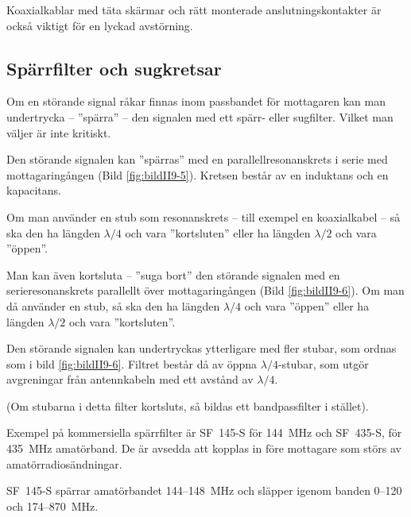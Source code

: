 Koaxialkablar med täta skärmar och rätt monterade anslutningskontakter är också
viktigt för en lyckad avstörning.

\subsection{Spärrfilter och sugkretsar}
\label{spärrfilter}
\label{Sugkretsar}




Om en störande signal råkar finnas inom passbandet för mottagaren kan
man undertrycka -- ''spärra'' -- den signalen med ett spärr- eller sugfilter.
Vilket man väljer är inte kritiskt.

Den störande signalen kan ''spärras'' med en parallellresonanskrets i
serie med mottagaringången (Bild \ref{fig:bildII9-5}).
Kretsen består av en induktans och en kapacitans.

Om man använder en stub som resonanskrets -- till exempel en koaxialkabel -- så
ska den ha längden \(\lambda/4\) och vara ''kortsluten'' eller ha
längden \(\lambda/2\) och vara ''öppen''.

Man kan även kortsluta -- ''suga bort'' den störande signalen med en
serieresonanskrets parallellt över mottagaringången (Bild \ref{fig:bildII9-6}).
Om man då använder en stub, så ska den ha längden \(\lambda/4\) och
vara ''öppen'' eller ha längden \(\lambda/2\) och vara ''kortsluten''.

Den störande signalen kan undertryckas ytterligare med fler stubar,
som ordnas som i bild \ref{fig:bildII9-6}.
Filtret består då av öppna \(\lambda/4\)-stubar, som utgör avgreningar från
antennkabeln med ett avstånd av \(\lambda/4\).

(Om stubarna i detta filter kortsluts, så bildas ett bandpassfilter i stället).

Exempel på kommersiella spärrfilter är SF~145-S för 144~MHz och
SF~435-S, för 435~MHz amatörband.
De är avsedda att kopplas in före mottagare som störs av amatörradiosändningar.

SF~145-S spärrar amatörbandet 144--148~MHz och släpper igenom banden
0--120 och 174--870~MHz.


